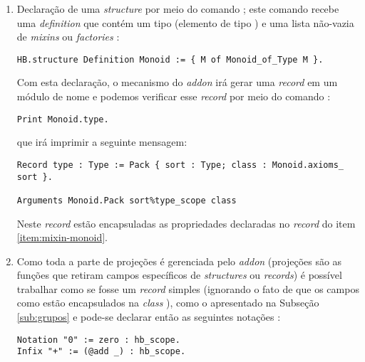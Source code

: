 {{\begin{enumerate}
        \item Declaração de uma \textit{structure} por meio do comando ; este comando recebe uma \textit{definition} que contém um tipo (elemento de tipo ) e uma lista não-vazia de \textit{mixins} ou \textit{factories} \cite{cohen:hal-02478907}:
            \begin{lstlisting}[language=coq, frame=single, tabsize=1]
HB.structure Definition Monoid := { M of Monoid_of_Type M }.
            \end{lstlisting}
        Com esta declaração, o mecanismo do \textit{addon}  irá gerar uma \textit{record} em um módulo de nome  e podemos verificar esse \textit{record} por meio do comando \cite{cohen:hal-02478907}:
            \begin{lstlisting}[language=coq, frame=single, tabsize=1]
Print Monoid.type.   
            \end{lstlisting}
        que irá imprimir a seguinte mensagem:
            \begin{lstlisting}[language=coq-error, frame=single, tabsize=1]
Record type : Type := Pack { sort : Type; class : Monoid.axioms_ sort }.

Arguments Monoid.Pack sort%type_scope class
            \end{lstlisting}
        Neste \textit{record} estão encapsuladas as propriedades declaradas no \textit{record} do item \ref{item:mixin-monoid}.
    
        \item Como toda a parte de projeções é gerenciada pelo \textit{addon}  (projeções são as funções que retiram campos específicos de \textit{structures} ou \textit{records}) é possível trabalhar como se  fosse um \textit{record} simples (ignorando o fato de que os campos como  estão encapsulados na \textit{class} ), como o apresentado na Subseção \ref{sub:grupos} e pode-se declarar então as seguintes notações \cite{cohen:hal-02478907}:
            \begin{lstlisting}[language=coq, frame=single, tabsize=1]
Notation "0" := zero : hb_scope.
Infix "+" := (@add _) : hb_scope.
            \end{lstlisting}


\end{enumerate}}}
